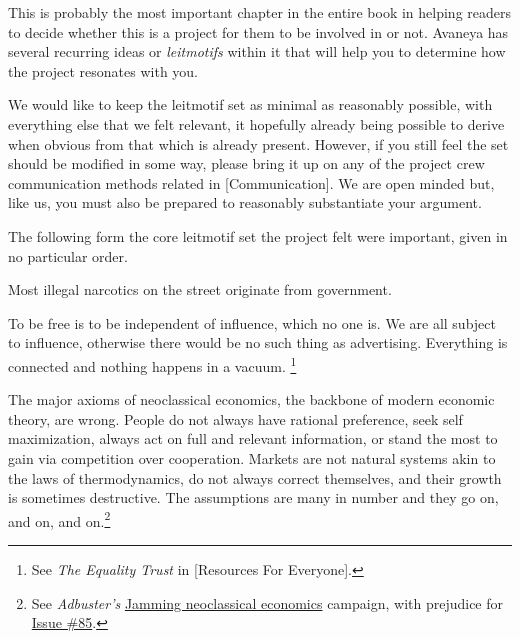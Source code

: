 

This is probably the most important chapter in the entire book in helping readers to decide whether this is a project for them to be involved in or not. Avaneya has several recurring ideas or {\it leitmotifs} within it that will help you to determine how the project resonates with you.

We would like to keep the leitmotif set as minimal as reasonably possible, with everything else that we felt relevant, it hopefully already being possible to derive when obvious from that which is already present. However, if you still feel the set should be modified in some way, please bring it up on any of the project crew communication methods related in [Communication]. We are open minded but, like us, you must also be prepared to reasonably substantiate your argument.

The following form the core leitmotif set the project felt were important, given in no particular order.

\startitemize[4]

Most illegal narcotics on the street originate from government.


To be free is to be independent of influence, which no one is. We are all subject to influence, otherwise there would be no such thing as advertising. Everything is connected and nothing happens in a vacuum. \footnote{See {\it The Equality Trust} in [Resources For Everyone].}


The major axioms of neoclassical economics, the backbone of modern economic theory, are wrong. People do not always have rational preference, seek self maximization, always act on full and relevant information, or stand the most to gain via competition over cooperation. Markets are not natural systems akin to the laws of thermodynamics, do not always correct themselves, and their growth is sometimes destructive. The assumptions are many in number and they go on, and on, and on.\footnote{See {\it Adbuster's} \href{http://anticap.wordpress.com/2010/10/25/jamming-neoclassical-economics/}{Jamming neoclassical economics} campaign, with prejudice for \href{http://www.adbusters.org/cultureshop/backissues/85}{Issue \#85}.}

